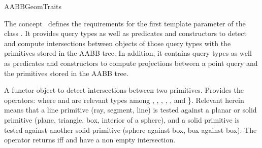 \ccRefPageBegin


\begin{ccRefConcept}{AABBGeomTraits}


\ccDefinition
  
The concept \ccRefName\ defines the requirements for the first template parameter of the class . It provides query types as well as predicates and constructors to detect and compute intersections between objects of those query types with the primitives stored in the AABB tree. In addition, it contains query types as well as predicates and constructors to compute projections between a point query and the primitives stored in the AABB tree.


\ccTypes


{A functor object to detect intersections between two primitives.
Provides the operators:
where  and  are relevant types
among , , , , ,  and  \}. Relevant herein means that a line primitive (ray, segment, line) is tested against a planar or solid primitive (plane, triangle, box, interior of a sphere), and a solid primitive is tested against another solid primitive (sphere against box, box against box). The operator returns  iff  and  have a non empty intersection.}


\end{ccRefConcept}
